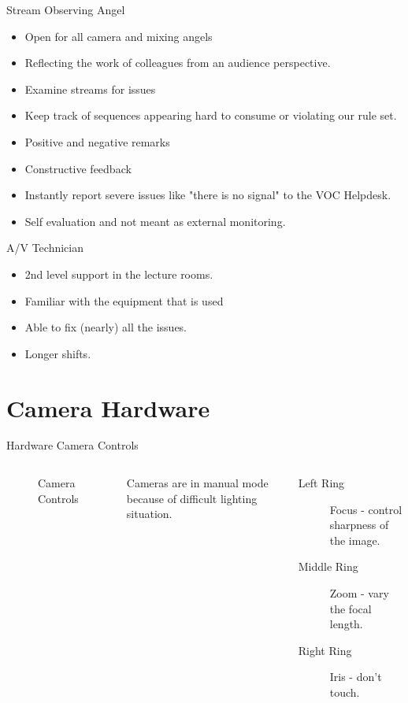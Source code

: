 \documentclass[aspectratio=169]{beamer}
\begin{document}
\begin{frame}{Stream Observing Angel}
	\begin{itemize}
		\item Open for all camera and mixing angels
		\item Reflecting the work of colleagues from an audience perspective.
		\item Examine streams for issues 
		\item Keep track of sequences appearing hard to consume or violating our rule set. 
		\item Positive and negative remarks 
		\item Constructive feedback 
		\item Instantly report severe issues like "there is no signal" to the VOC Helpdesk.
		\item Self evaluation and not meant as external monitoring. 
	\end{itemize}
\end{frame}

\begin{frame}{A/V Technician}
	\begin{itemize}
		\item 2nd level support in the lecture rooms. 
		\item Familiar with the equipment that is used 
		\item Able to fix (nearly) all the issues. 
		\item Longer shifts.
	\end{itemize}
\end{frame}

\section{Camera Hardware}
\begin{frame}{Hardware Camera Controls}
	\begin{columns}[T,onlytextwidth]
	\begin{figure} 
		\centering
		\def\svgwidth{0.9\textwidth}
		
		\caption{Camera Controls}
		\label{fig:cc1}
	\end{figure}
	Cameras are in manual mode because of difficult lighting situation.
	\begin{description}
		\item[Left Ring] Focus - control sharpness of the image.
		\item[Middle Ring] Zoom - vary the focal length.
		\item[Right Ring] Iris - don't touch.
     \end{description}
\end{columns}
\end{frame}
\end{document}
